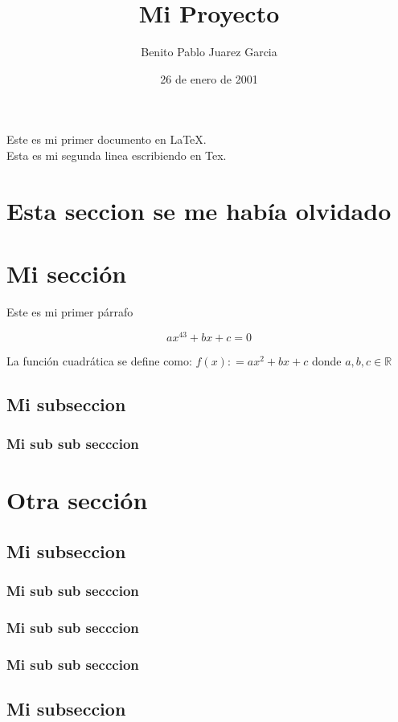 \documentclass{article}
\title{Mi Proyecto}
\author{Benito Pablo Juarez Garcia}
\date{26 de enero de 2001}%
\begin{document}
\maketitle

\newpage

\tableofcontents

\newpage

Este es mi primer documento en \LaTeX. \\

Esta es mi segunda linea escribiendo en Tex.

\section{Esta seccion se me había olvidado}

\section{Mi secci\'on}
Este es mi primer párrafo 

\begin{equation}
ax^{43} + bx + c = 0
\end{equation}

La función  cuadrática se define como:  $f(x)\colon = ax^{2} + bx + c $ donde $a, b,c \in \mathbb{R}$






\subsection{Mi subseccion}

\subsubsection{Mi sub sub secccion}

\section{Otra secci\'on}

\subsection{Mi subseccion}

\subsubsection{Mi sub sub secccion}

\subsubsection{Mi sub sub secccion}

\subsubsection{Mi sub sub secccion}

\subsection{Mi subseccion}
\end{document}
